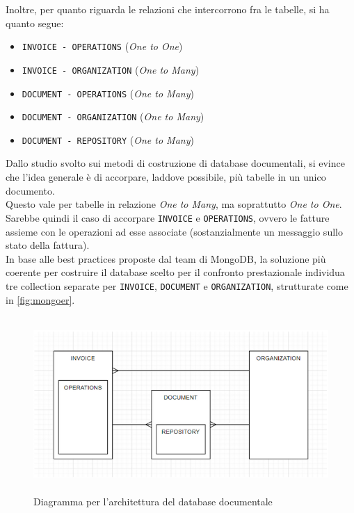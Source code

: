 \noindent Inoltre, per quanto riguarda le relazioni che intercorrono fra le tabelle, si ha quanto segue:
\begin{itemize}
    \item \texttt{INVOICE - OPERATIONS} (\textit{One to One})
    \item \texttt{INVOICE - ORGANIZATION} (\textit{One to Many})
    \item \texttt{DOCUMENT - OPERATIONS} (\textit{One to Many})
    \item \texttt{DOCUMENT - ORGANIZATION} (\textit{One to Many})
    \item \texttt{DOCUMENT - REPOSITORY} (\textit{One to Many})
\end{itemize}

\noindent Dallo studio svolto sui metodi di costruzione di database documentali, si evince che l'idea generale è di accorpare, laddove possibile, più tabelle in un unico documento.\\
Questo vale per tabelle in relazione \textit{One to Many}, ma soprattutto \textit{One to One}.\\
Sarebbe quindi il caso di accorpare \texttt{INVOICE} e \texttt{OPERATIONS}, ovvero le fatture assieme con le operazioni ad esse associate (sostanzialmente un messaggio sullo stato della fattura).\\

\noindent In base alle best practices proposte dal team di MongoDB, la soluzione più coerente per costruire il database scelto per il confronto prestazionale individua tre collection separate per \texttt{INVOICE}, \texttt{DOCUMENT} e \texttt{ORGANIZATION}, strutturate come in \autoref{fig:mongoer}.\\

\begin{figure}[htbp]
\begin{center}
\includegraphics[height=18em]{immagini/ER-Mongo-IC.png}
\caption{Diagramma per l'architettura del database documentale}
\label{fig:mongoer}
\end{center}
\end{figure}

